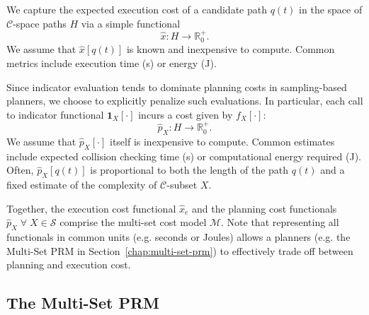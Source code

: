 We capture the expected execution cost of a candidate path
$q(t)$ in the space of $\mathcal{C}$-space paths $H$
via a simple functional
\begin{equation}
  \hat{x} : H \rightarrow \mathbb{R}_0^+ .
\end{equation}
We assume that $\hat{x}[q(t)]$ is known and inexpensive to compute.
Common metrics include
execution time (s) or energy (J).

Since indicator evaluation tends to dominate planning costs
in sampling-based planners,
we choose to explicitly penalize such evaluations.
In particular,
each call to indicator functional $\mathbf{1}_X[\cdot]$
incurs a cost given by $f_X[\cdot]$:
\begin{equation}
  {\hat p}_X : H \rightarrow \mathbb{R}_0^+ .
\end{equation}
We assume that ${\hat p}_X[\cdot]$ itself is inexpensive to compute.
Common estimates include expected collision checking time (s)
or computational energy required (J).
Often, ${\hat p}_X[q(t)]$ is proportional to both
the length of the path $q(t)$
and a fixed estimate of the complexity of $\mathcal{C}$-subset $X$.

Together, the execution cost functional ${\hat x}_e$
and the planning cost functionals ${\hat p}_X \;\forall\; X \in \mathcal{S}$
comprise the multi-set cost model $\mathcal{M}$.
Note that representing all functionals in common units
(e.g. seconds or Joules) allows a planners
(e.g. the Multi-Set PRM in Section~\ref{chap:multi-set-prm})
to effectively trade off between planning and execution cost.

\subsection{The Multi-Set PRM}


